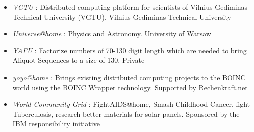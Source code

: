 \begin{itemize}
	\item {\em VGTU} : Distributed computing platform for scientists of Vilnius Gediminas Technical University (VGTU).	Vilnius Gediminas Technical University
	\item {\em Universe@home} : Physics and Astronomy. University of Warsaw
	\item {\em YAFU} : Factorize numbers of 70-130 digit length which are needed to bring Aliquot Sequences to a size of 130.	Private	
	\item {\em yoyo@home} : Brings existing distributed computing projects to the BOINC world using the BOINC Wrapper technology. Supported by Rechenkraft.net 
	\item {\em World Community Grid} : FightAIDS@home, Smash Childhood Cancer, fight Tuberculosis, research better materials for solar panels.	Sponsored by the IBM responsibility initiative
	
\end{itemize}
		

